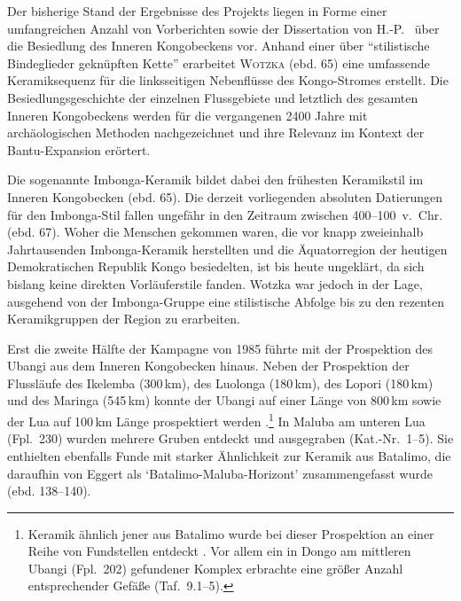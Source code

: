Der bisherige Stand der Ergebnisse des Projekts liegen in Forme einer umfangreichen Anzahl von Vorberichten \parencites{Eggert.1980b}{Eggert.1981}{Eggert.1983}{Eggert.1984}{Eggert.1984b}{Eggert.1987}{Eggert.1987c}{Eggert.1992}{Eggert.1993} sowie der Dissertation von H.-P.~\textcite{Wotzka.1995} über die Besiedlung des Inneren Kongobeckens vor. Anhand einer über \enquote{stilistische Bindeglieder geknüpften Kette} erarbeitet \textsc{Wotzka} (ebd. 65) eine umfassende Keramiksequenz für die linksseitigen Nebenflüsse des Kongo-Stromes erstellt. Die Besiedlungsgeschichte der einzelnen Flussgebiete und letztlich des gesamten Inneren Kongobeckens werden für die vergangenen 2400 Jahre mit archäologischen Methoden nachgezeichnet und ihre Relevanz im Kontext der Bantu-Expansion erörtert.

Die sogenannte Imbonga-Keramik bildet dabei den frühesten Keramikstil im Inneren Kongobecken (ebd. 65). Die derzeit vorliegenden absoluten Datierungen für den Imbonga-Stil fallen ungefähr in den Zeitraum zwischen 400--100~v.~Chr. (ebd. 67). Woher die Menschen gekommen waren, die vor knapp zweieinhalb Jahrtausenden Imbonga-Keramik herstellten und die Äquatorregion der heutigen Demokratischen Republik Kongo besiedelten, ist bis heute ungeklärt, da sich bislang keine direkten Vorläuferstile fanden. Wotzka war jedoch in der Lage, ausgehend von der Imbonga-Gruppe eine stilistische Abfolge bis zu den rezenten Keramikgruppen der Region zu erarbeiten.

Erst die zweite Hälfte der Kampagne von 1985 führte mit der Prospektion des Ubangi aus dem Inneren Kongobecken hinaus. Neben der Prospektion der Flussläufe des Ikelemba (300\,km), des Luolonga (180\,km), des Lopori (180\,km) und des Maringa (545\,km) konnte der Ubangi auf einer Länge von 800\,km sowie der Lua auf 100\,km Länge prospektiert werden \parencite[129]{Eggert.1987c}.\footnote{Keramik ähnlich jener aus Batalimo \parencites{deBayledesHermens.1975}{Aumassip.1975} wurde bei dieser Prospektion an einer Reihe von Fundstellen entdeckt \parencite[134 Fig.~4]{Eggert.1987c}. Vor allem ein in Dongo am mittleren Ubangi (Fpl.~202) gefundener Komplex erbrachte eine größer Anzahl entsprechender Gefäße (Taf.~9.1--5).} In Maluba am unteren Lua (Fpl.~230) wurden mehrere Gruben entdeckt und ausgegraben (Kat.-Nr.~1--5). Sie enthielten ebenfalls Funde mit starker Ähnlichkeit zur Keramik aus Batalimo, die daraufhin von Eggert als \enquote*{Batalimo-Maluba-Horizont} zusammengefasst wurde (ebd. 138--140).

